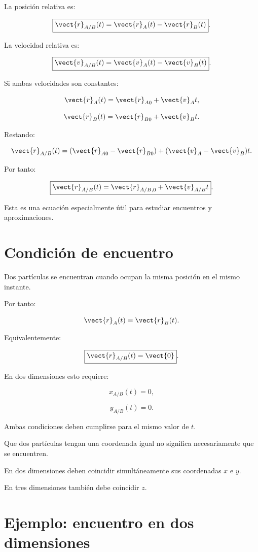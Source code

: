 La posición relativa es:

\[
\boxed{
\vect{r}_{A/B}(t)
=
\vect{r}_A(t)-\vect{r}_B(t)
}.
\]

La velocidad relativa es:

\[
\boxed{
\vect{v}_{A/B}(t)
=
\vect{v}_A(t)-\vect{v}_B(t)
}.
\]

Si ambas velocidades son constantes:

\[
\vect{r}_A(t)
=
\vect{r}_{A0}+\vect{v}_At,
\]

\[
\vect{r}_B(t)
=
\vect{r}_{B0}+\vect{v}_Bt.
\]

Restando:

\[
\vect{r}_{A/B}(t)
=
(\vect{r}_{A0}-\vect{r}_{B0})
+
(\vect{v}_A-\vect{v}_B)t.
\]

Por tanto:

\[
\boxed{
\vect{r}_{A/B}(t)
=
\vect{r}_{A/B,0}
+
\vect{v}_{A/B}t
}.
\]

Esta es una ecuación especialmente útil
para estudiar encuentros y aproximaciones.


\section{Condición de encuentro}

Dos partículas se encuentran cuando ocupan
la misma posición en el mismo instante.

Por tanto:

\[
\vect{r}_A(t)=\vect{r}_B(t).
\]

Equivalentemente:

\[
\boxed{
\vect{r}_{A/B}(t)=\vect{0}
}.
\]

En dos dimensiones esto requiere:

\[
\boxed{
x_{A/B}(t)=0
},
\]

\[
\boxed{
y_{A/B}(t)=0
}.
\]

Ambas condiciones deben cumplirse
para el mismo valor de \(t\).

\begin{advertencia}

Que dos partículas tengan una coordenada igual
no significa necesariamente que se encuentren.

En dos dimensiones deben coincidir
simultáneamente sus coordenadas \(x\) e \(y\).

En tres dimensiones también debe coincidir \(z\).

\end{advertencia}


\section{Ejemplo: encuentro en dos dimensiones}

